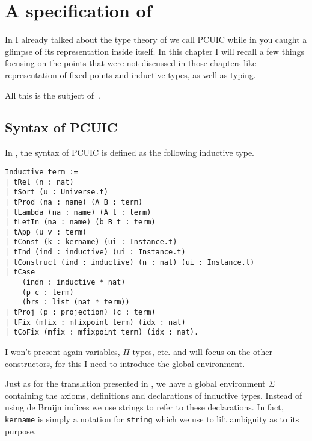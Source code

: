 \chapter{A specification of \Coq}

In  I already talked about the type theory of \Coq we call
\acrshort{PCUIC} while in  you caught a glimpse of its
representation inside \Coq itself. In this chapter I will recall a few things
focusing on the points that were not discussed in those chapters like
representation of fixed-points and inductive types, as well as typing.

All this is the subject of~.

\section{Syntax of \acrshort{PCUIC}}

In \MetaCoq, the syntax of \acrshort{PCUIC} is defined as the following
inductive type.
\begin{verbatim}
Inductive term :=
| tRel (n : nat)
| tSort (u : Universe.t)
| tProd (na : name) (A B : term)
| tLambda (na : name) (A t : term)
| tLetIn (na : name) (b B t : term)
| tApp (u v : term)
| tConst (k : kername) (ui : Instance.t)
| tInd (ind : inductive) (ui : Instance.t)
| tConstruct (ind : inductive) (n : nat) (ui : Instance.t)
| tCase
    (indn : inductive * nat)
    (p c : term)
    (brs : list (nat * term))
| tProj (p : projection) (c : term)
| tFix (mfix : mfixpoint term) (idx : nat)
| tCoFix (mfix : mfixpoint term) (idx : nat).
\end{verbatim}

I won't present again variables, \(\Pi\)-types, etc. and will focus on
the other constructors, for this I need to introduce the global environment.


Just as for the translation presented in , we have
a global environment \(\Sigma\) containing the axioms, definitions and
declarations of inductive types. Instead of using de Bruijn indices we use
strings to refer to these declarations. In fact, \texttt{kername}
is simply a notation for \texttt{string} which we use to lift
ambiguity as to its purpose.


